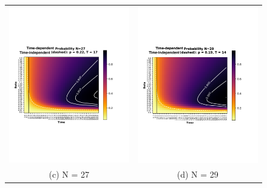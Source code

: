 \documentclass[aps,pra,reprint, onecolumn]{revtex4-2}
\begin{document}
\begin{figure}[ht]
\begin{tabular}{cc}
\includegraphics[width=90mm]{./figures/27.pdf} &   \includegraphics[width=90mm]{./figures/29.pdf} \\
(c) N = 27 & (d) N = 29\\[6pt]
\end{tabular}
\end{figure}

\end{document}
